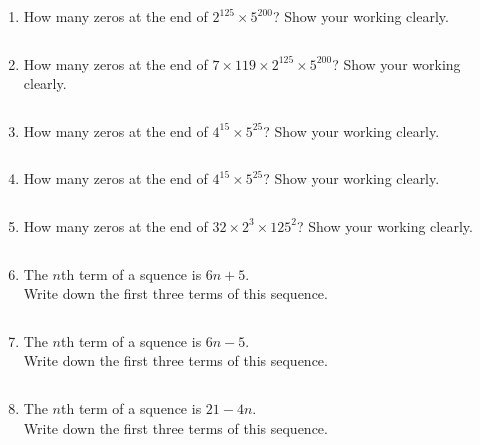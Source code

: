 \begin{enumerate} [leftmargin=0cm]
\item   How many zeros at the end of $2^{125} \times 5^{200}$? Show your working clearly.       \begin{envAnswer}[blankline= 2 ] $  $ \end{envAnswer}

\item   How many zeros at the end of $7\times 119 \times 2^{125} \times 5^{200}$? Show your working clearly.        \begin{envAnswer}[blankline= 2 ] $  $ \end{envAnswer}

\item   How many zeros at the end of $4^{15} \times 5^{25}$? Show your working clearly.       \begin{envAnswer}[blankline= 2 ] $  $ \end{envAnswer}

\item   How many zeros at the end of $4^{15} \times 5^{25}$? Show your working clearly.        \begin{envAnswer}[blankline= 2 ] $  $ \end{envAnswer}

\item   How many zeros at the end of $32 \times 2^3 \times 125^2$? Show your working clearly.       \begin{envAnswer}[blankline= 2 ] $  $ \end{envAnswer}
                
                
\item   The $n$th term of a squence is $6n+5$. \\            
   Write down the first three terms of this sequence. \\      \begin{envAnswer}[blankline= 2 ] $  $ \end{envAnswer}
                
\item   The $n$th term of a squence is $6n-5$. \\            
   Write down the first three terms of this sequence. \\      \begin{envAnswer}[blankline= 2 ] $  $ \end{envAnswer}

\item   The $n$th term of a squence is $21-4n$. \\             
   Write down the first three terms of this sequence. \\       \begin{envAnswer}[blankline= 2 ] $  $ \end{envAnswer}


\end{enumerate}
